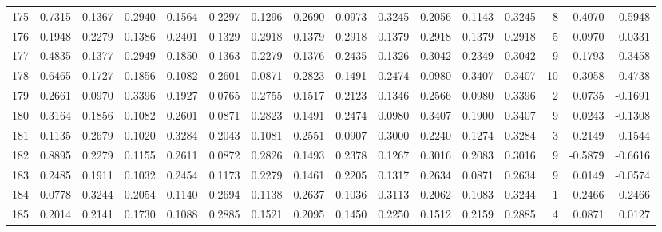 \begin{tabular}{lrrrrrrrrrrrrrrr}
175 &      0.7315 &  0.1367 &  0.2940 &  0.1564 &  0.2297 &  0.1296 &  0.2690 &  0.0973 &  0.3245 &  0.2056 &   0.1143 &     0.3245 &      8 &                   -0.4070 &                    -0.5948 \\
176 &      0.1948 &  0.2279 &  0.1386 &  0.2401 &  0.1329 &  0.2918 &  0.1379 &  0.2918 &  0.1379 &  0.2918 &   0.1379 &     0.2918 &      5 &                    0.0970 &                     0.0331 \\
177 &      0.4835 &  0.1377 &  0.2949 &  0.1850 &  0.1363 &  0.2279 &  0.1376 &  0.2435 &  0.1326 &  0.3042 &   0.2349 &     0.3042 &      9 &                   -0.1793 &                    -0.3458 \\
178 &      0.6465 &  0.1727 &  0.1856 &  0.1082 &  0.2601 &  0.0871 &  0.2823 &  0.1491 &  0.2474 &  0.0980 &   0.3407 &     0.3407 &     10 &                   -0.3058 &                    -0.4738 \\
179 &      0.2661 &  0.0970 &  0.3396 &  0.1927 &  0.0765 &  0.2755 &  0.1517 &  0.2123 &  0.1346 &  0.2566 &   0.0980 &     0.3396 &      2 &                    0.0735 &                    -0.1691 \\
180 &      0.3164 &  0.1856 &  0.1082 &  0.2601 &  0.0871 &  0.2823 &  0.1491 &  0.2474 &  0.0980 &  0.3407 &   0.1900 &     0.3407 &      9 &                    0.0243 &                    -0.1308 \\
181 &      0.1135 &  0.2679 &  0.1020 &  0.3284 &  0.2043 &  0.1081 &  0.2551 &  0.0907 &  0.3000 &  0.2240 &   0.1274 &     0.3284 &      3 &                    0.2149 &                     0.1544 \\
182 &      0.8895 &  0.2279 &  0.1155 &  0.2611 &  0.0872 &  0.2826 &  0.1493 &  0.2378 &  0.1267 &  0.3016 &   0.2083 &     0.3016 &      9 &                   -0.5879 &                    -0.6616 \\
183 &      0.2485 &  0.1911 &  0.1032 &  0.2454 &  0.1173 &  0.2279 &  0.1461 &  0.2205 &  0.1317 &  0.2634 &   0.0871 &     0.2634 &      9 &                    0.0149 &                    -0.0574 \\
184 &      0.0778 &  0.3244 &  0.2054 &  0.1140 &  0.2694 &  0.1138 &  0.2637 &  0.1036 &  0.3113 &  0.2062 &   0.1083 &     0.3244 &      1 &                    0.2466 &                     0.2466 \\
185 &      0.2014 &  0.2141 &  0.1730 &  0.1088 &  0.2885 &  0.1521 &  0.2095 &  0.1450 &  0.2250 &  0.1512 &   0.2159 &     0.2885 &      4 &                    0.0871 &                     0.0127 \\

\end{tabular}
